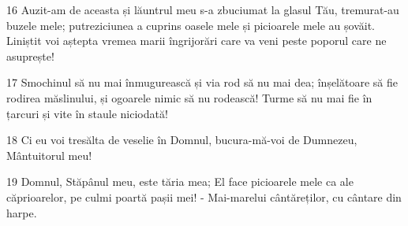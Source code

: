 \par 16 Auzit-am de aceasta și lăuntrul meu s-a zbuciumat la glasul Tău, tremurat-au buzele mele; putreziciunea a cuprins oasele mele și picioarele mele au șovăit. Liniștit voi aștepta vremea marii îngrijorări care va veni peste poporul care ne asuprește!
\par 17 Smochinul să nu mai înmugurească și via rod să nu mai dea; înșelătoare să fie rodirea măslinului, și ogoarele nimic să nu rodească! Turme să nu mai fie în țarcuri și vite în staule niciodată!
\par 18 Ci eu voi tresălta de veselie în Domnul, bucura-mă-voi de Dumnezeu, Mântuitorul meu!
\par 19 Domnul, Stăpânul meu, este tăria mea; El face picioarele mele ca ale căprioarelor, pe culmi poartă pașii mei! - Mai-marelui cântăreților, cu cântare din harpe.


